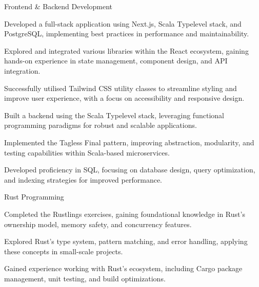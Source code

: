 
\begin{cventries}

  \cventry
    {Frontend \& Backend Development} %
    {} %
    {} %
    {} %
    {
      \begin{cvitems} %
        \item {Developed a full-stack application using Next.js, Scala Typelevel stack, and PostgreSQL, implementing best practices in performance and maintainability.}
        \item {Explored and integrated various libraries within the React ecosystem, gaining hands-on experience in state management, component design, and API integration.}
        \item {Successfully utilised Tailwind CSS utility classes to streamline styling and improve user experience, with a focus on accessibility and responsive design.}
        \item {Built a backend using the Scala Typelevel stack, leveraging functional programming paradigms for robust and scalable applications.}
        \item {Implemented the Tagless Final pattern, improving abstraction, modularity, and testing capabilities within Scala-based microservices.}
        \item {Developed proficiency in SQL, focusing on database design, query optimization, and indexing strategies for improved performance.}
      \end{cvitems}
    }

  \cventry
    {Rust Programming} %
    {} %
    {} %
    {} %
    {
      \begin{cvitems}
        \item {Completed the Rustlings exercises, gaining foundational knowledge in Rust’s ownership model, memory safety, and concurrency features.}
        \item {Explored Rust’s type system, pattern matching, and error handling, applying these concepts in small-scale projects.}
        \item {Gained experience working with Rust’s ecosystem, including Cargo package management, unit testing, and build optimizations.}
      \end{cvitems}
    }


\end{cventries}
